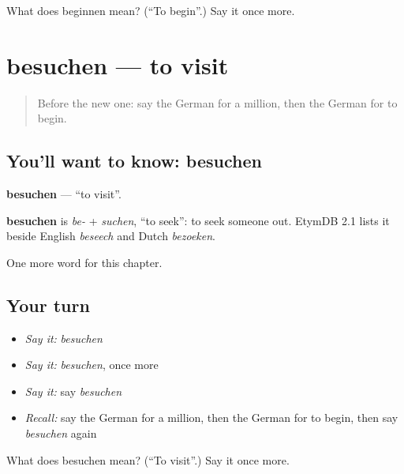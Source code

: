 \begin{tcolorbox}[breakable,colback=teal!4,colframe=teal!35!black,title={Before you move on}]
What does beginnen mean? (\textquotedblleft{}To begin\textquotedblright{}.) Say it once more.
\end{tcolorbox}
\section[besuchen]{besuchen — to visit}

\label{lesson:GE-C139-besuchen}



\begin{quote}
Before the new one: say the German for a million, then the German for to begin.
\end{quote}

\subsection*{You'll want to know: besuchen}
\textbf{besuchen} — \textquotedblleft{}to visit\textquotedblright{}.

\begin{cousinweb}
\textbf{besuchen} is \emph{be-} + \emph{suchen}, \textquotedblleft{}to seek\textquotedblright{}: to seek someone out. EtymDB 2.1 lists it beside English \emph{beseech} and Dutch \emph{bezoeken}.
\end{cousinweb}

\begin{grammarlens}[title={What you've built}]
One more word for this chapter.
\end{grammarlens}

\subsection*{Your turn}
\begin{itemize}
\raggedright
  \item \emph{Say it:} \emph{besuchen}
  \item \emph{Say it:} \emph{besuchen}, once more
  \item \emph{Say it:} say \emph{besuchen}
  \item \emph{Recall:} say the German for a million, then the German for to begin, then say \emph{besuchen} again
\end{itemize}

\begin{tcolorbox}[breakable,colback=teal!4,colframe=teal!35!black,title={Before you move on}]
What does besuchen mean? (\textquotedblleft{}To visit\textquotedblright{}.) Say it once more.
\end{tcolorbox}
